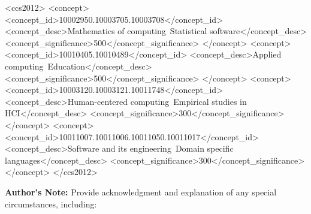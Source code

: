 \documentclass[acmsmall,screen,anonymous,review]{acmart}
\begin{document}
%


\begin{CCSXML}
<ccs2012>
<concept>
<concept_id>10002950.10003705.10003708</concept_id>
<concept_desc>Mathematics of computing~Statistical software</concept_desc>
<concept_significance>500</concept_significance>
</concept>
<concept>
<concept_id>10010405.10010489</concept_id>
<concept_desc>Applied computing~Education</concept_desc>
<concept_significance>500</concept_significance>
</concept>
<concept>
<concept_id>10003120.10003121.10011748</concept_id>
<concept_desc>Human-centered computing~Empirical studies in HCI</concept_desc>
<concept_significance>300</concept_significance>
</concept>
<concept>
<concept_id>10011007.10011006.10011050.10011017</concept_id>
<concept_desc>Software and its engineering~Domain specific languages</concept_desc>
<concept_significance>300</concept_significance>
</concept>
</ccs2012>
\end{CCSXML}



%


%
\maketitle

\textbf{Author's Note:} Provide acknowledgment and explanation of any special circumstances, including:
\end{document}

